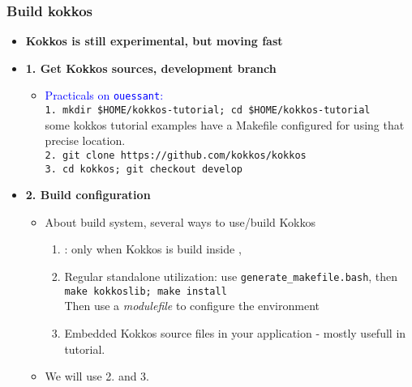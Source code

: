 \begin{frame}
  \frametitle{Build kokkos}

  \begin{itemize}
  \item \textbf{Kokkos is still experimental, but moving fast}
  \item \textbf{1. Get Kokkos sources, development branch}
    \begin{itemize}
    \item \textcolor{blue}{Practicals on \texttt{ouessant}:}\\
      \texttt{1. mkdir \$HOME/kokkos-tutorial; cd \$HOME/kokkos-tutorial}\\
      some kokkos tutorial examples have a Makefile configured for using that precise location.\\
      \texttt{2. git clone https://github.com/kokkos/kokkos}\\
      \texttt{3. cd kokkos; git checkout develop}
    \end{itemize}
  \item \textbf{2. Build configuration}
    \begin{itemize}
    \item About build system, several ways to use/build Kokkos
      \begin{enumerate}
      \item {}: only when Kokkos is build inside ,
      \item Regular standalone utilization: use \texttt{generate\_makefile.bash}, then \texttt{make kokkoslib; make install}\\
        Then use a \textit{modulefile} to configure the environment
      \item Embedded Kokkos source files in your application - mostly usefull in tutorial.
      \end{enumerate}
      \item We will use 2. and 3.
    \end{itemize}
  \end{itemize}
 
\end{frame}

